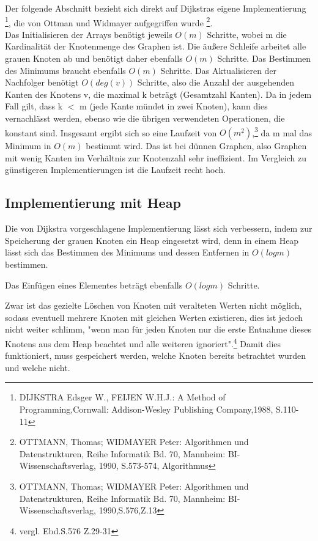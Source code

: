 Der folgende Abschnitt bezieht sich direkt auf Dijkstras eigene Implementierung \footnote{DIJKSTRA Edsger W., FEIJEN W.H.J.: A Method of Programming,Cornwall: Addison-Wesley Publishing Company,1988, S.110-11}, die von Ottman und Widmayer aufgegriffen wurde \footnote{OTTMANN, Thomas; WIDMAYER Peter: Algorithmen und Datenstrukturen, Reihe Informatik Bd. 70, Mannheim: BI-Wissenschaftsverlag, 1990, S.573-574, Algorithmus}.\\
Das Initialisieren der Arrays benötigt jeweils $O(m)$ Schritte, wobei m die Kardinalität der Knotenmenge des Graphen ist.
Die äußere Schleife arbeitet alle grauen Knoten ab und benötigt daher ebenfalls $O(m)$ Schritte. Das Bestimmen des Minimums braucht ebenfalls $O(m)$ Schritte.
Das Aktualisieren der Nachfolger benötigt $O(deg(v))$ Schritte, also die Anzahl der ausgehenden Kanten des Knotens v, die maximal k beträgt (Gesamtzahl Kanten). Da in jedem Fall gilt, dass k $<$ m (jede Kante mündet in zwei Knoten), kann dies vernachlässt werden, ebenso wie die übrigen verwendeten Operationen, die konstant sind.
Insgesamt ergibt sich so eine Laufzeit von $O(m^{2})$,\footnote{OTTMANN, Thomas; WIDMAYER Peter: Algorithmen und Datenstrukturen, Reihe Informatik Bd. 70, Mannheim: BI-Wissenschaftsverlag, 1990,S.576,Z.13} da m mal das Minimum in $O(m)$ bestimmt wird.
Das ist bei dünnen Graphen, also Graphen mit wenig Kanten im Verhältnis zur Knotenzahl sehr ineffizient. Im Vergleich zu günstigeren Implementierungen ist die Laufzeit recht hoch.

\subsection{Implementierung mit Heap}
Die von Dijkstra vorgeschlagene Implementierung lässt sich verbessern, indem zur Speicherung der grauen Knoten ein Heap eingesetzt wird, denn in einem Heap lässt sich das Bestimmen des Minimums und dessen Entfernen in $O(log m)$ bestimmen.

\parindent0pt Das Einfügen eines Elementes beträgt ebenfalls $O(log m)$ Schritte.

\parindent0pt Zwar ist das gezielte Löschen von Knoten mit veralteten Werten nicht möglich, sodass eventuell mehrere Knoten mit gleichen Werten existieren, dies ist jedoch nicht weiter schlimm, "wenn man für jeden Knoten nur die erste Entnahme dieses Knotens aus dem Heap beachtet und alle weiteren ignoriert".\footnote{vergl. Ebd.S.576 Z.29-31} Damit dies funktioniert, muss  gespeichert werden, welche Knoten bereits betrachtet wurden und welche nicht.

